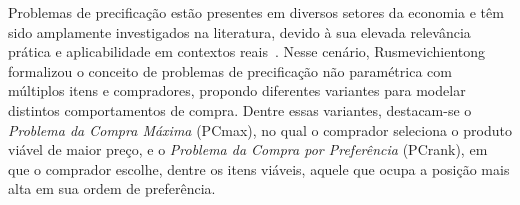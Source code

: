 Problemas de precificação estão presentes em diversos setores da economia e têm sido amplamente investigados na literatura, devido à sua elevada relevância prática e aplicabilidade em contextos reais~\cite{aggarwal2004,venkatesan2005,shmuel1984,shmuel1987,smith1986}. Nesse cenário, Rusmevichientong~\cite{rusmevichientong2006} formalizou o conceito de problemas de precificação não paramétrica com múltiplos itens e compradores, propondo diferentes variantes para modelar distintos comportamentos de compra. Dentre essas variantes, destacam-se o \textit{Problema da Compra Máxima} (PCmax), no qual o comprador seleciona o produto viável de maior preço, e o \textit{Problema da Compra por Preferência} (PCrank), em que o comprador escolhe, dentre os itens viáveis, aquele que ocupa a posição mais alta em sua ordem de preferência.




